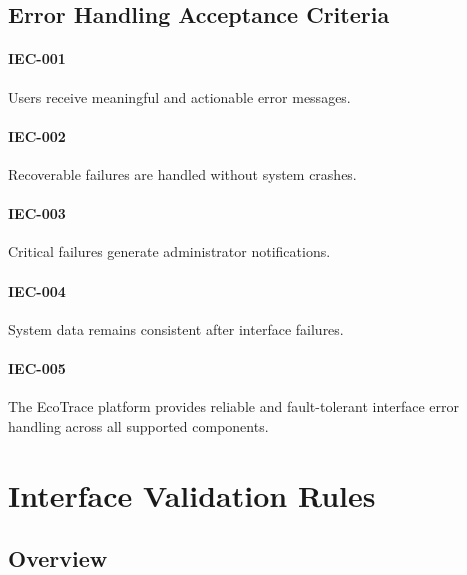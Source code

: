 
\subsection*{Error Handling Acceptance Criteria}

\paragraph{IEC-001}

Users receive meaningful and actionable error messages.

\paragraph{IEC-002}

Recoverable failures are handled without system crashes.

\paragraph{IEC-003}

Critical failures generate administrator notifications.

\paragraph{IEC-004}

System data remains consistent after interface failures.

\paragraph{IEC-005}

The EcoTrace platform provides reliable and fault-tolerant interface
error handling across all supported components.

\section{Interface Validation Rules}


\subsection{Overview}

